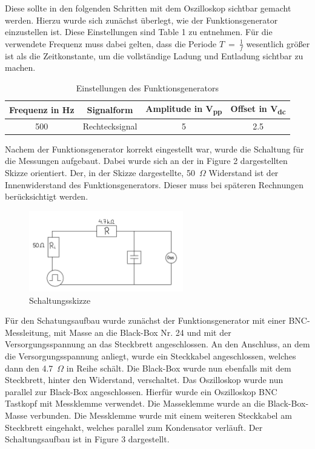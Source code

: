\documentclass[a4paper,12pt]{article}
\begin{document}
\noindent Diese sollte in den folgenden Schritten mit dem Oszilloskop sichtbar gemacht werden. Hierzu wurde sich zunächst überlegt, wie der Funktionsgenerator einzustellen ist. Diese Einstellungen sind Table 1 zu entnehmen. Für die verwendete Frequenz muss dabei gelten, dass die Periode \(T~=~\frac{1}{f}\) wesentlich größer ist als die Zeitkonstante, um die vollständige Ladung und Entladung sichtbar zu machen.

\begin{table}[H]
	\centering
	\begin{tabular}{|c|c|c|c|}
		\hline
		\textbf{Frequenz in Hz} & \textbf{Signalform} & \textbf{Amplitude in V\textsubscript{pp}} & \textbf{Offset in V\textsubscript{dc}}\\
		\hline
		500 & Rechtecksignal & 5 & 2.5\\
		\hline
	\end{tabular}
	\caption{Einstellungen des Funktionsgenerators}
\end{table}

\noindent Nachem der Funktionsgenerator korrekt eingestellt war, wurde die Schaltung  für die Messungen aufgebaut. Dabei wurde sich an der in Figure 2 dargestellten Skizze orientiert. Der, in der Skizze dargestellte, 50~$\Omega$ Widerstand ist der Innenwiderstand des Funktionsgenerators. Dieser muss bei späteren Rechnungen berücksichtigt werden.\\

\begin{figure}[H]
    \centering
    \includegraphics[width=0.6\textwidth]{../Quellen/Labor2/SchaltungsaufbauVersuch1.jpeg}
\caption{Schaltungsskizze}
\end{figure}

\noindent Für den Schatungsaufbau wurde zunächst der Funktionsgenerator mit einer BNC-Messleitung, mit Masse an die Black-Box Nr. 24 und mit der Versorgungsspannung an das Steckbrett angeschlossen. An den Anschluss, an dem die Versorgungsspannung anliegt, wurde ein Steckkabel angeschlossen, welches dann den 4.7~$\Omega$ in Reihe schält. Die Black-Box wurde nun ebenfalls mit dem Steckbrett, hinter den Widerstand, verschaltet. Das Oszilloskop wurde nun parallel zur Black-Box angeschlossen. Hierfür wurde ein Oszilloskop BNC Tastkopf mit Messklemme verwendet. Die Masseklemme wurde an die Black-Box-Masse verbunden. Die Messklemme wurde mit einem weiteren Steckkabel am Steckbrett eingehakt, welches parallel zum Kondensator verläuft. Der Schaltungsaufbau ist in Figure 3 dargestellt.
\end{document}
